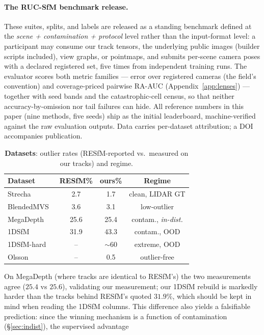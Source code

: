 \documentclass{article}
\begin{document}
\paragraph{The RUC-SfM benchmark release.} These suites, splits, and labels are
released as a standing benchmark defined at the \emph{scene + contamination +
protocol} level rather than the input-format level: a participant may consume our
track tensors, the underlying public images (builder scripts included), view graphs,
or pointmaps, and submits per-scene camera poses with a declared registered set, five
times from independent training runs. The evaluator scores both metric families ---
error over registered cameras (the field's convention) and coverage-priced pairwise
RA-AUC (Appendix~\ref{app:lenses}) --- together with seed bands and the
catastrophic-cell census, so that neither accuracy-by-omission nor tail failures can
hide. All reference numbers in this paper (nine methods, five seeds) ship as the
initial leaderboard, machine-verified against the raw evaluation outputs. Data
carries per-dataset attribution; a DOI accompanies publication.
\begin{table}[t]\centering\footnotesize
\caption{\textbf{Datasets}: outlier rates (RESfM-reported vs.\ measured on our tracks) and regime.}
\label{tab:datasets}
\setlength{\tabcolsep}{1.2pt}%
\begin{tabular}{lccc}
\toprule
Dataset & RESfM\% & ours\% & Regime\\
\midrule
Strecha~\citep{strecha} & 2.7 & 1.7 & clean, LIDAR GT\\
BlendedMVS~\citep{blendedmvs} & 3.6 & 3.1 & low-outlier\\
MegaDepth~\citep{megadepth} & 25.6 & 25.4 & contam., \emph{in-dist.}\\
1DSfM~\citep{onedsfm} & 31.9 & 43.3 & contam., OOD\\
1DSfM-hard & -- & $\sim$60 & extreme, OOD\\
Olsson~\citep{olsson} & -- & 0.5 & outlier-free\\
\bottomrule
\end{tabular}
\end{table}
On MegaDepth (where tracks are identical to RESfM's) the two measurements agree
($25.4$ vs $25.6$), validating our measurement; our 1DSfM rebuild is markedly harder than
the tracks behind RESfM's quoted $31.9\%$, which should be kept in mind when reading the
1DSfM columns. This difference also yields a falsifiable prediction: since the winning
mechanism is a function of contamination (\S\ref{sec:indist}), the supervised advantage
\end{document}
